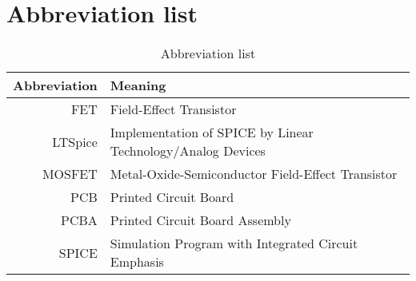 \section{Abbreviation list}
\label{sec:abbreviation_list}

\begin{table}[H]
\centering
\begin{tabular}{|r|l|}
\hline
\textbf{Abbreviation} & \textbf{Meaning}                                        \\ \hline
FET          & Field-Effect Transistor                                          \\ \hline
LTSpice      & Implementation of SPICE by Linear Technology/Analog Devices      \\ \hline
MOSFET       & Metal-Oxide-Semiconductor Field-Effect Transistor                \\ \hline
PCB          & Printed Circuit Board                                            \\ \hline
PCBA         & Printed Circuit Board Assembly                                   \\ \hline
SPICE        & Simulation Program with Integrated Circuit Emphasis \\ \hline

\end{tabular}
\caption{Abbreviation list}\label{Abbreviationlist}
\label{tab:variable_ids}
\end{table}
